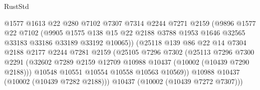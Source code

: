 \begin{lexlean}{RustStd}
\begin{coremodule}
                              @1577
                              @1613
                              @22
                              @280
                              @7102
                              @7307
                              @7314
                              @2244
                              @7271
                              @2159
                              (@9896
                                @1577
                                @22
                                @7102
                                (@9905
                                  @1575
                                  @138
                                  @15
                                  @22
                                  @2188
                                  @3788
                                  @1953
                                  @1646
                                  @32565
                                  @33183
                                  @33186
                                  @33189
                                  @33192
                                  @10065))
                              (@25118
                                @139
                                @86
                                @22
                                @14
                                @7304
                                @2188
                                @2177
                                @2244
                                @7281
                                @2159
                                (@25105
                                  @7296
                                  @7302
                                  (@25113
                                    @7296
                                    @7300
                                    @2291
                                    (@32602
                                      @7289
                                      @2159
                                      @12709
                                      @10988
                                      @10437
                                      (@10002 (@10439 @7290 @2188)))
                                    @10548
                                    @10551
                                    @10554
                                    @10558
                                    @10563
                                    @10569))
                                @10988
                                @10437
                                (@10002 (@10439 @7282 @2188)))
                              @10437
                              (@10002 (@10439 @7272 @7307)))

\end{coremodule}
\end{lexlean}
